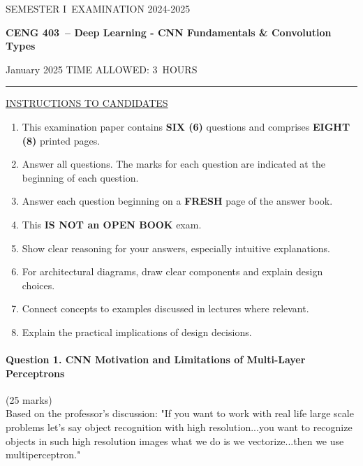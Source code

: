 \documentclass[12pt]{article}
\newcommand{\masunitnumber}{CENG 403}
\newcommand{\examdate}{January 2025}
\newcommand{\academicyear}{2024-2025}
\newcommand{\semester}{I}
\newcommand{\coursename}{Deep Learning - CNN Fundamentals \& Convolution Types}
\newcommand{\numberofhours}{3}
\begin{document}
\setlength{\headsep}{5truemm}
\setlength{\headheight}{14.5truemm}
\setlength{\voffset}{-0.45truein}
\renewcommand{\headrulewidth}{0.0pt}
\begin{center}
SEMESTER \semester\ EXAMINATION \academicyear
\end{center}
\begin{center}
{\bf \masunitnumber\ -- \coursename}
\end{center}
\vspace{20truemm}
\noindent \examdate\hspace{45truemm} TIME ALLOWED: \numberofhours\ HOURS
\vspace{19truemm}
\hrule
\vspace{19truemm}
\noindent\underline{INSTRUCTIONS TO CANDIDATES}
\vspace{8truemm}
\begin{enumerate}
\item This examination paper contains {\bf SIX (6)} questions and comprises 
{\bf EIGHT (8)} printed pages.
\item Answer all questions. 
The marks for each question are indicated at the beginning of each question.
\item Answer each question beginning on a {\bf FRESH} page of the answer book.
\item This {\bf IS NOT an OPEN BOOK} exam.
\item Show clear reasoning for your answers, especially intuitive explanations.
\item For architectural diagrams, draw clear components and explain design choices.
\item Connect concepts to examples discussed in lectures where relevant.
\item Explain the practical implications of design decisions.
\end{enumerate}
\newpage
\lhead{}
\rhead{\masunitnumber}
\chead{}
\lfoot{}
\cfoot{\thepage}
\rfoot{}
\setlength{\footskip}{45pt}

\paragraph{Question 1. CNN Motivation and Limitations of Multi-Layer Perceptrons}{\hfill (25 marks)}\\
Based on the professor's discussion: "If you want to work with real life large scale problems let's say object recognition with high resolution...you want to recognize objects in such high resolution images what we do is we vectorize...then we use multiperceptron."
\end{document}
